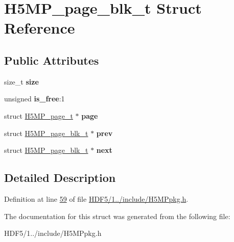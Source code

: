 \hypertarget{struct_h5_m_p__page__blk__t}{}\section{H5\+M\+P\+\_\+page\+\_\+blk\+\_\+t Struct Reference}
\label{struct_h5_m_p__page__blk__t}
\subsection*{Public Attributes}
\begin{DoxyCompactItemize}
\item 
\mbox{\label{struct_h5_m_p__page__blk__t_aee78a101132c7de370f73d4a99e7c686}} 
size\+\_\+t {\bfseries size}
\item 
\mbox{\label{struct_h5_m_p__page__blk__t_aeea556739d7fa6e37fe2495769ffd3ff}} 
unsigned {\bfseries is\+\_\+free}\+:1
\item 
\mbox{\label{struct_h5_m_p__page__blk__t_a9c93566f94ab5c7e9873e8365dd20036}} 
struct \hyperlink{struct_h5_m_p__page__t}{H5\+M\+P\+\_\+page\+\_\+t} $\ast$ {\bfseries page}
\item 
\mbox{\label{struct_h5_m_p__page__blk__t_a742c3aa738578c1c57cb576318781196}} 
struct \hyperlink{struct_h5_m_p__page__blk__t}{H5\+M\+P\+\_\+page\+\_\+blk\+\_\+t} $\ast$ {\bfseries prev}
\item 
\mbox{\label{struct_h5_m_p__page__blk__t_a0f14d6d747d946fa1c3e1b8b9f2f5100}} 
struct \hyperlink{struct_h5_m_p__page__blk__t}{H5\+M\+P\+\_\+page\+\_\+blk\+\_\+t} $\ast$ {\bfseries next}
\end{DoxyCompactItemize}


\subsection{Detailed Description}


Definition at line \hyperlink{_h_d_f5_21_810_81_2include_2_h5_m_ppkg_8h_source_l00059}{59} of file \hyperlink{_h_d_f5_21_810_81_2include_2_h5_m_ppkg_8h_source}{H\+D\+F5/1../include/\+H5\+M\+Ppkg.\+h}.



The documentation for this struct was generated from the following file\+:\begin{DoxyCompactItemize}
\item 
H\+D\+F5/1../include/\+H5\+M\+Ppkg.\+h\end{DoxyCompactItemize}
